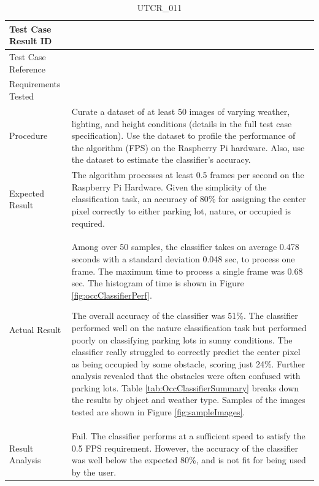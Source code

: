 \documentclass[12pt, titlepage]{article}
\begin{document}
\begin{table}[!h]
\begin{center}
\caption {UTCR\_011}
\label{tab:UTCR_011}
\begin{tabular}{ | m{3.2cm} | m{12.2cm} | } 
\hline
Test Case Result ID & \nameref{tab:UTCR_011} \\ 
\hline
Test Case Reference & \nameref{tab:UTC_011}  \\ 
\hline
Requirements Tested & \nameref{GEN_005} \\ 
\hline
Procedure &  Curate a dataset of at least 50 images of varying weather, lighting, and height conditions (details in the full test case specification). Use the dataset to profile the performance of the algorithm (FPS) on the Raspberry Pi hardware. Also, use the dataset to estimate the classifier's accuracy.  \\ 
\hline
Expected Result & The algorithm processes at least 0.5 frames per second on the Raspberry Pi Hardware. Given the simplicity of the classification task, an accuracy of 80\% for assigning the center pixel correctly to either parking lot, nature, or occupied is required. \\ 
\hline
Actual Result & Among over 50 samples, the classifier takes on average 0.478 seconds with a standard deviation 0.048 sec, to process one frame. The maximum time to process a single frame was 0.68 sec. The histogram of time is shown in Figure \ref{fig:occClassifierPerf}. 


The overall accuracy of the classifier was 51\%. The classifier performed well on the nature classification task but performed poorly on classifying parking lots in sunny conditions. The classifier really struggled to correctly predict the center pixel as being occupied by some obstacle, scoring just 24\%. Further analysis revealed that the obstacles were often confused with parking lots. Table \ref{tab:OccClassifierSummary} breaks down the results by object and weather type. Samples of the images tested are shown in Figure \ref{fig:sampleImages}. \\ 
\hline
Result Analysis & Fail. The classifier performs at a sufficient speed to satisfy the 0.5 FPS requirement. However, the accuracy of the classifier was well below the expected 80\%, and is not fit for being used by the user. \\ 
\hline
\end{tabular}
\end{center}
\end{table}
\end{document}
